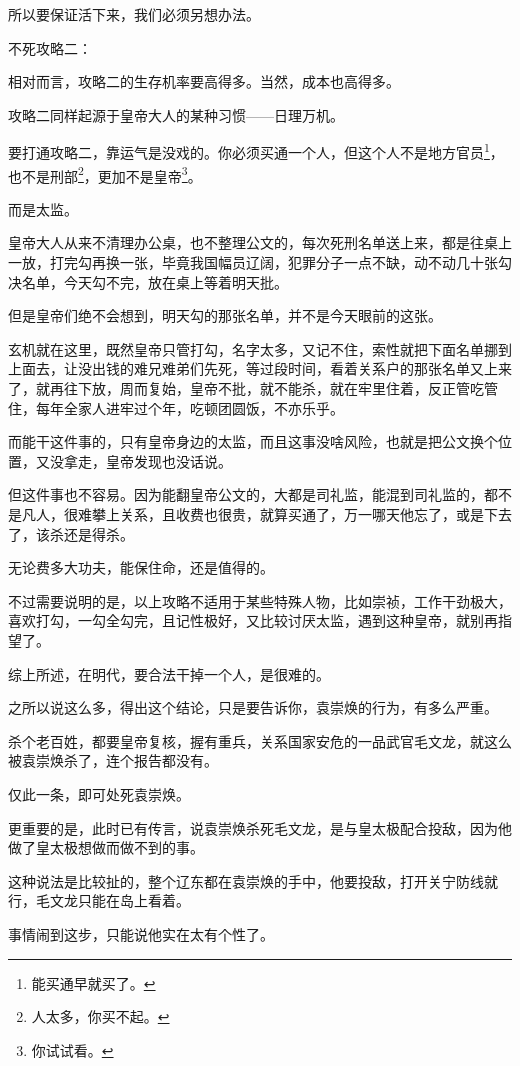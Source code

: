 \begin{multicols}{\theparacolNo}
		所以要保证活下来，我们必须另想办法。

		不死攻略二：

		相对而言，攻略二的生存机率要高得多。当然，成本也高得多。

		攻略二同样起源于皇帝大人的某种习惯——日理万机。

		要打通攻略二，靠运气是没戏的。你必须买通一个人，但这个人不是地方官员\footnote{能买通早就买了。}，也不是刑部\footnote{人太多，你买不起。}，更加不是皇帝\footnote{你试试看。}。

		而是太监。

		皇帝大人从来不清理办公桌，也不整理公文的，每次死刑名单送上来，都是往桌上一放，打完勾再换一张，毕竟我国幅员辽阔，犯罪分子一点不缺，动不动几十张勾决名单，今天勾不完，放在桌上等着明天批。

		但是皇帝们绝不会想到，明天勾的那张名单，并不是今天眼前的这张。

		玄机就在这里，既然皇帝只管打勾，名字太多，又记不住，索性就把下面名单挪到上面去，让没出钱的难兄难弟们先死，等过段时间，看着关系户的那张名单又上来了，就再往下放，周而复始，皇帝不批，就不能杀，就在牢里住着，反正管吃管住，每年全家人进牢过个年，吃顿团圆饭，不亦乐乎。

		而能干这件事的，只有皇帝身边的太监，而且这事没啥风险，也就是把公文换个位置，又没拿走，皇帝发现也没话说。

		但这件事也不容易。因为能翻皇帝公文的，大都是司礼监，能混到司礼监的，都不是凡人，很难攀上关系，且收费也很贵，就算买通了，万一哪天他忘了，或是下去了，该杀还是得杀。

		无论费多大功夫，能保住命，还是值得的。

		不过需要说明的是，以上攻略不适用于某些特殊人物，比如崇祯，工作干劲极大，喜欢打勾，一勾全勾完，且记性极好，又比较讨厌太监，遇到这种皇帝，就别再指望了。

		综上所述，在明代，要合法干掉一个人，是很难的。

		之所以说这么多，得出这个结论，只是要告诉你，袁崇焕的行为，有多么严重。

		杀个老百姓，都要皇帝复核，握有重兵，关系国家安危的一品武官毛文龙，就这么被袁崇焕杀了，连个报告都没有。

		仅此一条，即可处死袁崇焕。

		更重要的是，此时已有传言，说袁崇焕杀死毛文龙，是与皇太极配合投敌，因为他做了皇太极想做而做不到的事。

		这种说法是比较扯的，整个辽东都在袁崇焕的手中，他要投敌，打开关宁防线就行，毛文龙只能在岛上看着。

		事情闹到这步，只能说他实在太有个性了。


\end{multicols}
